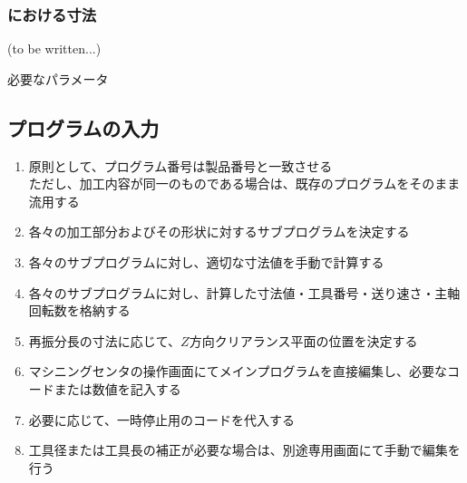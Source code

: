 \subsubsection{\EndFaceBoring における寸法\TBW}
(to be written...)
\begin{Parameter}{必要なパラメータ}
\PMEndFaceBoringCornerR{}\\
\PMACOD
\end{Parameter}


\clearpage
\subsection{プログラムの入力}
\begin{enumerate}
\item 原則として、プログラム番号は製品番号と一致させる\\
ただし、加工内容が同一のものである場合は、既存のプログラムをそのまま流用する
\item 各々の加工部分およびその形状に対するサブプログラムを決定する
\item 各々のサブプログラムに対し、適切な寸法値を手動で計算する
\item 各々のサブプログラムに対し、計算した寸法値・工具番号・送り速さ・主軸回転数を格納する
\item {}再振分長の寸法に応じて、$Z$方向クリアランス平面の位置を決定する
\item マシニングセンタの操作画面にてメインプログラムを直接編集し、必要なコードまたは数値を記入する
\item 必要に応じて、一時停止用のコードを代入する
\item {}工具径または工具長の補正が必要な場合は、別途専用画面にて手動で編集を行う
\end{enumerate}


